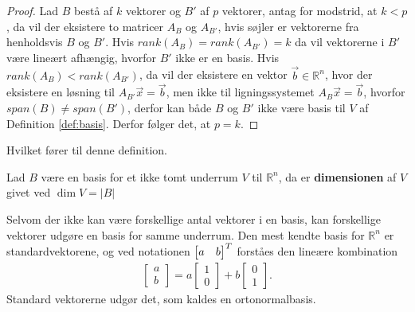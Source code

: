 \begin{proof}
Lad $B$ bestå af $k$ vektorer og $B'$ af $p$ vektorer, antag for modstrid, at $k < p$, da vil der eksistere to matricer $A_{B}$ og $A_{B'}$, hvis søjler er vektorerne fra henholdsvis $B$ og $B'$.
Hvis $rank(A_{B}) = rank(A_{B'}) = k$ da vil vektorerne i $B'$ være lineært afhængig, hvorfor $B'$ ikke er en basis.
Hvis $rank(A_{B}) < rank(A_{B'} )$, da vil der eksistere en vektor $\vec{b} \in \mathds{R}^n$, hvor der eksistere en løsning til $A_{B'}\vec{x} = \vec{b}$, men ikke til ligningssystemet $A_B \vec{x}=\vec{b}$, hvorfor $span(B) \neq span(B')$, derfor kan både $B$ og $B'$ ikke være basis til $V$ af Definition \ref{def:basis}.
Derfor følger det, at $p=k$.
\end{proof}
Hvilket fører til denne definition.
\begin{defn}[Dimension]
Lad $B$ være en basis for et ikke tomt underrum $V$ til $\mathds{R}^n$, da er \textbf{dimensionen} af $V$ givet ved $\dim{V} = |B|$
\label{def:dim}
\end{defn}
Selvom der ikke kan være forskellige antal vektorer i en basis, kan forskellige vektorer udgøre en basis for samme underrum.
Den mest kendte basis for $\mathds{R}^n$ er standardvektorene, og ved notationen $\begin{bmatrix} a & b \end{bmatrix}^T$ forståes den lineære kombination
\begin{align*}
\begin{bmatrix} a \\ b \end{bmatrix} = a\begin{bmatrix} 1 \\0 \end{bmatrix} + b \begin{bmatrix} 0 \\ 1 \end{bmatrix}.
\end{align*}
Standard vektorerne udgør det, som kaldes en ortonormalbasis.




